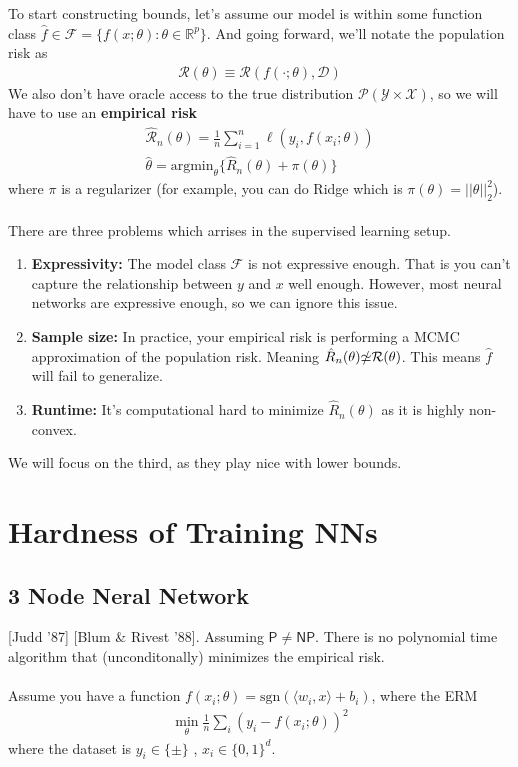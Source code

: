 To start constructing bounds, let's assume our model is within some function class $\hat f \in \mathcal F = \{f(x;\theta) : \theta \in \mathbb R^p\}$. And going forward, we'll notate the population risk as 
\begin{align}
	\mathcal R(\theta) \equiv \mathcal R(f(\cdot; \theta), \mathcal D)	
\end{align}
We also don't have oracle access to the true distribution $\mathcal P(\mathcal Y \times \mathcal X)$, so we will have to use an \textbf{empirical risk}
\begin{align}
	\hat{\mathcal R}_n(\theta) = \frac{1}{n} \sum_{i=1}^n \ell(y_i, f(x_i; \theta))\\
	\hat \theta = \text{argmin}_\theta \{\hat R_n(\theta) + \pi (\theta)\}
\end{align}
where $\pi$ is a regularizer (for example, you can do Ridge which is $\pi(\theta) = ||\theta||_2^2$).
\\
\\
There are three problems which arrises in the supervised learning setup.
\begin{enumerate}
	\item \textbf{Expressivity:} The model class $\mathcal F$ is not expressive enough. That is you can't capture the relationship between $y$ and $x$ well enough. However, most neural networks are expressive enough, so we can ignore this issue.
	\item \textbf{Sample size:} In practice, your empirical risk is performing a MCMC approximation of the population risk. Meaning  $\hat R_n(\theta) \slashed \simeq \mathcal R(\theta)$. This means $\hat f$ will fail to generalize.
	\item \textbf{Runtime:} It's computational hard to minimize $\hat R_n(\theta)$ as it is highly non-convex.
\end{enumerate}
We will focus on the third, as they play nice with lower bounds.


\section{Hardness of Training NNs}
\subsection{3 Node Neral Network}
[Judd '87] [Blum \& Rivest '88]. Assuming $\mathsf{P} \neq \mathsf{NP}$. There is no polynomial time algorithm that (unconditonally) minimizes the empirical risk.\\
\\
Assume you have a function $f(x_i; \theta) = \text{sgn}(\langle w_i, x\rangle + b_i)$, where the ERM
\begin{align}
	\min_\theta \frac{1}{n} \sum_i (y_i - f(x_i; \theta))^2
\end{align}
where the dataset is $y_i \in \{\pm \}$ , $x_i \in \{0,1\}^d$.

